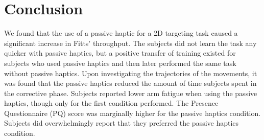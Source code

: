 \section{Conclusion}

We found that the use of a passive haptic for a 2D targeting task caused a significant increase in Fitts' throughput.
The subjects did not learn the task any quicker with passive haptics, but a positive transfer of training existed for subjects who used passive haptics and then later performed the same task without passive haptics.
Upon investigating the trajectories of the movements, it was found that the passive haptics reduced the amount of time subjects spent in the corrective phase.
Subjects reported lower arm fatigue when using the passive haptics, though only for the first condition performed.
The Presence Questionnaire (PQ) score was marginally higher for the passive haptics condition.
Subjects did overwhelmingly report that they preferred the passive haptics condition.
